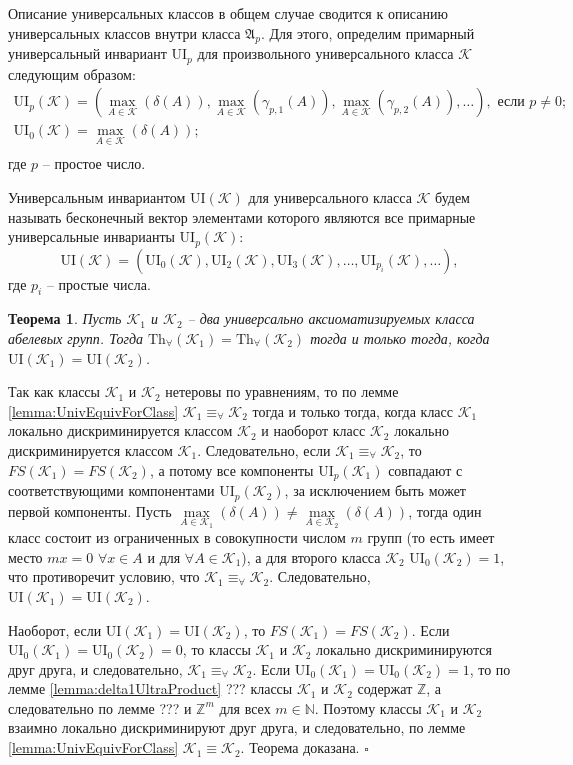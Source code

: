 \documentclass[a4paper,11pt,twoside]{article}
\newtheorem{theorem}{Теорема}[section]
\def\note#1{\marginpar{\textcolor{red}{#1}}}
\def\proof{{\noindent{\bf Доказательство.}} }
\def\A{{\mathfrak{A}}}
\def\K{{\mathcal{K}}}
\def\Z{{\mathbb{Z}}}
\def\N{{\mathbb{N}}}
\def\Tha{{\mathrm{Th}_\forall}}
\def\ui{{\mathrm{UI}}}
\begin{document}
Описание универсальных классов в общем случае сводится к описанию универсальных классов внутри класса $\A_p$. Для этого, определим примарный универсальный инвариант $\ui_p$ для произвольного универсального класса $\K$ следующим образом:
$$\begin{array}{c}
\ui_p(\K) = (\max\limits_{A \in \K}(\delta(A)),  \max\limits_{A \in \K}(\gamma_{p,1}(A)), \max\limits_{A \in \K}(\gamma_{p,2}(A)), \ldots), \text{ если } p \neq 0; \\
\ui_0(\K) = \max\limits_{A \in \K}(\delta(A)); \\
\end{array}$$
где $p$ -- простое число.

Универсальным инвариантом $\ui(\K)$ для универсального класса $\K$ будем называть бесконечный вектор элементами которого являются все примарные универсальные инварианты $\ui_p(\K)$:
$$\ui(\K) = (\ui_0(\K), \ui_2(\K), \ui_3(\K), \ldots, \ui_{p_i}(\K), \ldots ),$$
где $p_i$ -- простые числа.

\begin{theorem}\label{th:UnivClasses}
Пусть $\K_1$ и $\K_2$ -- два универсально аксиоматизируемых класса абелевых групп. Тогда $\Tha(\K_1) = \Tha(\K_2)$ тогда и только тогда, когда $\ui(\K_1) = \ui(\K_2)$.
\end{theorem}
\note{Отредактировать доказательство}
\proof Так как классы $\K_1$ и $\K_2$ нетеровы по уравнениям, то по лемме \ref{lemma:UnivEquivForClass} $\K_1 \equiv_\forall \K_2$ тогда и только тогда, когда класс $\K_1$ локально дискриминируется классом $\K_2$ и наоборот класс $\K_2$ локально дискриминируется классом $\K_1$. Следовательно, если $\K_1 \equiv_\forall \K_2$, то $FS(\K_1) = FS(\K_2)$, а потому все компоненты $\ui_p(\K_1)$ совпадают с соответствующими компонентами $\ui_p(\K_2)$, за исключением быть может первой компоненты. Пусть $\max\limits_{A \in \K_1}(\delta(A)) \neq \max\limits_{A \in \K_2} (\delta(A))$, тогда один класс состоит из ограниченных в совокупности числом $m$ групп (то есть имеет место $mx = 0$ $\forall x \in A$ и для $\forall A \in \K_1$), а для второго класса $\K_2$ $\ui_0(\K_2) = 1$, что противоречит условию, что $\K_1 \equiv_\forall \K_2$. Следовательно, $\ui(\K_1) = \ui(\K_2)$.

Наоборот, если $\ui(\K_1) = \ui(\K_2)$, то $FS(\K_1) = FS(\K_2)$. Если $\ui_0(\K_1) = \ui_0(\K_2) = 0$, то классы $\K_1$ и $\K_2$ локально дискриминируются друг друга, и следовательно, $\K_1 \equiv_\forall \K_2$. Если $\ui_0(\K_1) = \ui_0(\K_2) = 1$, то по лемме \ref{lemma:delta1UltraProduct} {\color{red}???} классы $\K_1$ и $\K_2$ содержат $\Z$, а следовательно по лемме {\color{red}???} и $\Z^m$ для всех $m \in \N$. Поэтому классы $\K_1$ и $\K_2$ взаимно локально дискриминируют друг друга, и следовательно, по лемме \ref{lemma:UnivEquivForClass} $\K_1 \equiv \K_2$. Теорема доказана. $\square$
\end{document}
